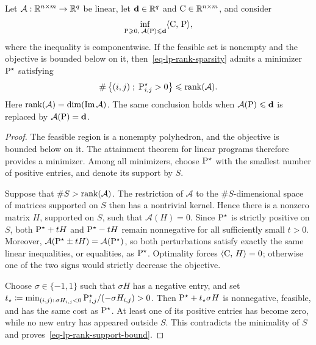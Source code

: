 \begin{prop}\label{prop-lp-rank-sparsity}
	Let $\mathcal A:\RR^{n\times m}\to\RR^q$ be linear, let $\mathbf d\in\RR^q$ and $\C\in\RR^{n\times m}$, and consider
	\begin{equation}\label{eq-lp-rank-sparsity}
		\inf_{\P\geq 0,\;\mathcal A(\P)\leq\mathbf d}
		\dotp{\C}{\P},
	\end{equation}
	where the inequality is componentwise. If the feasible set is nonempty and the objective is bounded below on it, then~\eqref{eq-lp-rank-sparsity} admits a minimizer $\P^\star$ satisfying
	\begin{equation}\label{eq-lp-rank-support-bound}
		\#\enscond{(i,j)}{\P^\star_{i,j}>0}
		\leq \rank(\mathcal A).
	\end{equation}
	Here $\rank(\mathcal A)=\dim(\operatorname{Im}\mathcal A)$. The same conclusion holds when $\mathcal A(\P)\leq\mathbf d$ is replaced by $\mathcal A(\P)=\mathbf d$.
\end{prop}

\begin{proof}
	The feasible region is a nonempty polyhedron, and the objective is bounded below on it. The attainment theorem for linear programs therefore provides a minimizer. Among all minimizers, choose $\P^\star$ with the smallest number of positive entries, and denote its support by $S$.

	Suppose that $\#S>\rank(\mathcal A)$. The restriction of $\mathcal A$ to the $\#S$-dimensional space of matrices supported on $S$ then has a nontrivial kernel. Hence there is a nonzero matrix $H$, supported on $S$, such that $\mathcal A(H)=0$. Since $\P^\star$ is strictly positive on $S$, both $\P^\star+tH$ and $\P^\star-tH$ remain nonnegative for all sufficiently small $t>0$. Moreover, $\mathcal A(\P^\star\pm tH)=\mathcal A(\P^\star)$, so both perturbations satisfy exactly the same linear inequalities, or equalities, as $\P^\star$. Optimality forces $\dotp{\C}{H}=0$; otherwise one of the two signs would strictly decrease the objective.

	Choose $\sigma\in\{-1,1\}$ such that $\sigma H$ has a negative entry, and set $t_\star\eqdef\min_{(i,j):\,\sigma H_{i,j}<0}\P^\star_{i,j}/(-\sigma H_{i,j})>0$.
	Then $\P^\star+t_\star\sigma H$ is nonnegative, feasible, and has the same cost as $\P^\star$. At least one of its positive entries has become zero, while no new entry has appeared outside $S$. This contradicts the minimality of $S$ and proves~\eqref{eq-lp-rank-support-bound}.
\end{proof}

